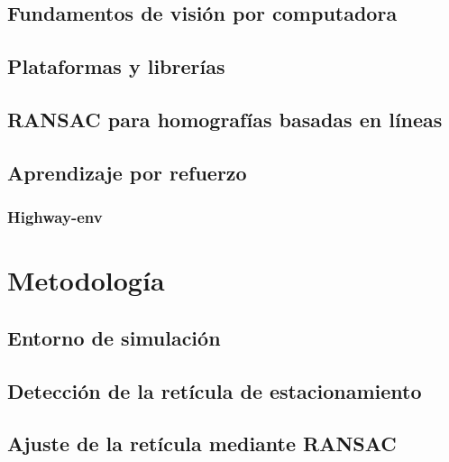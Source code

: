 \documentclass[10pt,letterpaper,final]{report}
\newlength{\spacing}
\newcommand{\nspace}[1]{\setlength{\baselineskip}{#1\spacing}}
\newenvironment{linespacing}[1]{\nspace{#1}}{}
\begin{document}
\begin{linespacing}{1.5}
\section{Fundamentos de visión por computadora}\label{sec:vision}


\section{Plataformas y librerías}\label{sec:plataformas}


\section{RANSAC para homografías basadas en líneas}\label{sec:ransac-teorico}


\section{Aprendizaje por refuerzo}


\subsection{Highway-env}


\clearpage
\chapter{Metodología}\label{chap:metodologia}


\section{Entorno de simulación}\label{sec:carla}


\section{Detección de la retícula de estacionamiento}\label{sec:metodo-reticula}


\section{Ajuste de la retícula mediante RANSAC}\label{sec:metodo-ransac}



\end{linespacing}
\end{document}
